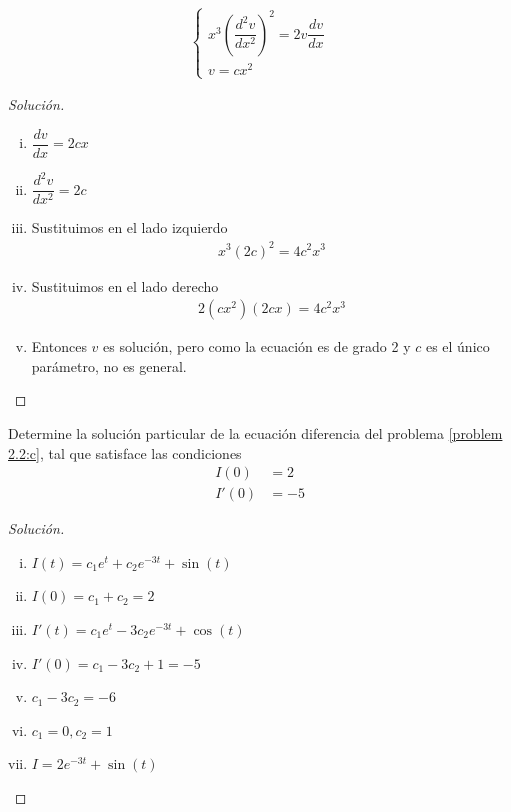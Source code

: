 
\begin{align*}
	\begin{cases}
		x^{3}\left(\dfrac{d^{2}v}{dx^{2}}\right)^{2} = 2v\dfrac{dv}{dx} \\
		v = cx^{2}
	\end{cases}
\end{align*}


\begin{proof}[Solución]
	\begin{enumerate}[(i)]
		\item $ \dfrac{dv}{dx}=2cx $
		\item $ \dfrac{d^{2}v}{dx^{2}}=2c $
		\item Sustituimos en el lado izquierdo
		\begin{align*}
			x^{3}\left(2c\right)^{2}=4c^{2}x^{3}
		\end{align*}
		\item Sustituimos en el lado derecho
		\begin{align*}
			2\left(cx^{2}\right)\left(2cx\right)= 4c^{2}x^{3}
		\end{align*}
		\item Entonces $v$ es solución, pero como la ecuación es de grado 2 y $c$ es el único parámetro, no es general.
	\end{enumerate}
\end{proof}


\begin{resuelto}
	Determine la solución particular de la ecuación diferencia del problema \ref{problem 2.2:c}, tal que satisface las condiciones
	\begin{align*}
		I(0)&=2\\
		I'(0)&=-5
	\end{align*}
\end{resuelto}



\begin{proof}[Solución]
	\begin{enumerate}[(i)]
		\item $I(t)=c_{1}e^{t}+c_{2}e^{-3t}+\sin(t)$
		\item $I(0)= c_{1}+c_{2}=  2$
		\item $I'(t)= c_{1}e^{t}-3c_{2}e^{-3t}+\cos(t)$
		\item $I'(0)= c_{1}-3c_{2}+1= -5$
		\item $c_{1}-3c_{2}=-6$
		\item $c_{1}=0, c_{2}=1$
		\item $I= 2e^{-3t}+\sin(t)$
	\end{enumerate}
\end{proof}

